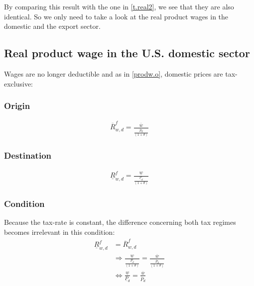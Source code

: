 By comparing this result with the one in \eqref{t.real2}, we see that they are also identical. So we only need to take a look at the real product wages in the domestic and the export sector.

\subsection*{Real product wage in the U.S. domestic sector}
Wages are no longer deductible and as in \eqref{prodw.o}, domestic prices are tax-exclusive:
\subsubsection*{Origin}
\begin{equation}\label{prodw2.o}
\begin{aligned}
\overline R^f_{w, d} = \frac{\overline w}{\frac{\overline P_d}{ \left( 1+\theta \right) }}\end{aligned}  \end{equation}

\subsubsection*{Destination}
\begin{equation}\label{prodw2.d}
\begin{aligned}
\underline R^f_{w, d} = \frac{\underline w}{\frac{\underline P_d}{ \left( 1+\theta \right) }}\end{aligned}  \end{equation}

\subsubsection*{Condition}
Because the tax-rate is constant, the difference concerning both tax regimes becomes  irrelevant in this condition:
\begin{equation}\label{prodw2.con}
\begin{aligned}
    \underline R^f_{w, d} &= \overline R^f_{w, d} \\ &\Rightarrow \frac{\underline w}{\frac{\underline P_d}{ \left( 1+\theta \right) }} = \frac{\overline w}{\frac{\overline P_d}{ \left( 1+\theta \right) }} \\ &\Leftrightarrow \frac{\underline w}{\underline P_d} = \frac{\overline w}{\overline P_d} 
\end{aligned}  \end{equation}


